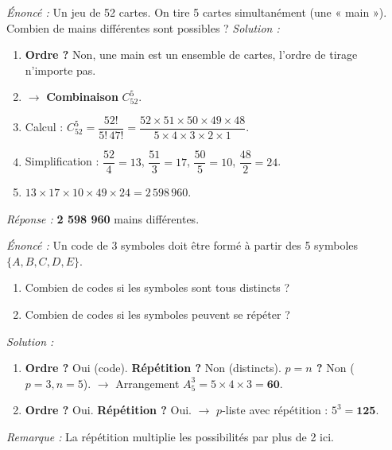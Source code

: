 \documentclass[11pt]{article}
\begin{document}
\begin{exoresolu}
\emph{Énoncé :} Un jeu de 52 cartes. On tire 5 cartes simultanément (une « main »). Combien de mains différentes sont possibles ?
\tcblower
\emph{Solution :}
\begin{enumerate}
    \item \textbf{Ordre ?} Non, une main est un ensemble de cartes, l'ordre de tirage n'importe pas.
    \item $\rightarrow$ \textbf{Combinaison} $C_{52}^5$.
    \item Calcul : $C_{52}^5 = \dfrac{52!}{5!\,47!} = \dfrac{52 \times 51 \times 50 \times 49 \times 48}{5 \times 4 \times 3 \times 2 \times 1}$.
    \item Simplification : $\dfrac{52}{4}=13$, $\dfrac{51}{3}=17$, $\dfrac{50}{5}=10$, $\dfrac{48}{2}=24$.
    \item $13 \times 17 \times 10 \times 49 \times 24 = 2\,598\,960$.
\end{enumerate}
\emph{Réponse :} \textbf{2 598 960} mains différentes.
\end{exoresolu}

\begin{exoresolu}
\emph{Énoncé :} Un code de 3 symboles doit être formé à partir des 5 symboles $\{A, B, C, D, E\}$.
\begin{enumerate}
    \item Combien de codes si les symboles sont tous distincts ?
    \item Combien de codes si les symboles peuvent se répéter ?
\end{enumerate}
\tcblower
\emph{Solution :}
\begin{enumerate}
    \item \textbf{Ordre ?} Oui (code). \textbf{Répétition ?} Non (distincts). \textbf{$p=n$ ?} Non ($p=3, n=5$).
    $\rightarrow$ Arrangement $A_5^3 = 5 \times 4 \times 3 = \mathbf{60}$.
    \item \textbf{Ordre ?} Oui. \textbf{Répétition ?} Oui.
    $\rightarrow$ $p$-liste avec répétition : $5^3 = \mathbf{125}$.
\end{enumerate}
\emph{Remarque :} La répétition multiplie les possibilités par plus de 2 ici.
\end{exoresolu}
\end{document}
